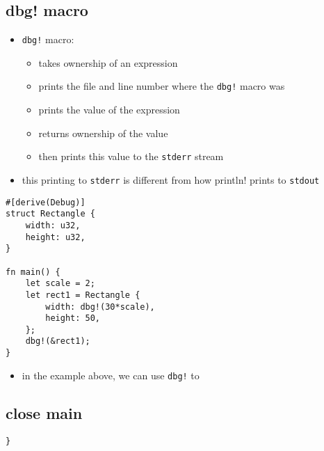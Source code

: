\documentclass[11pt]{article}
\begin{document}
\subsection{dbg! macro}
\label{sec:org1482ff7}
\begin{itemize}
\item \texttt{dbg!} macro:
\begin{itemize}
\item takes ownership of an expression
\item prints the file and line number where the \texttt{dbg!} macro was
\item prints the value of the expression
\item returns ownership of the value
\item then prints this value to the \texttt{stderr} stream
\end{itemize}
\item this printing to \texttt{stderr} is different from how println! prints to \texttt{stdout}
\end{itemize}
\begin{verbatim}
#[derive(Debug)]
struct Rectangle {
    width: u32,
    height: u32,
}

fn main() {
    let scale = 2;
    let rect1 = Rectangle {
        width: dbg!(30*scale),
        height: 50,
    };
    dbg!(&rect1);
}
\end{verbatim}
\begin{itemize}
\item in the example above, we can use \texttt{dbg!} to
\end{itemize}
\subsection{close main}
\label{sec:orgad1fe96}
\begin{verbatim}
}
\end{verbatim}
\end{document}
